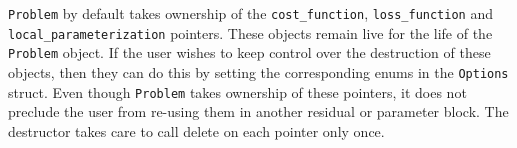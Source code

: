   \texttt{Problem} by default takes ownership of the
  \texttt{cost\_function}, \texttt{loss\_function} and \\ \texttt{local\_parameterization} pointers. These objects remain
   live for the life of the \texttt{Problem} object. If the user wishes to
  keep control over the destruction of these objects, then they can
  do this by setting the corresponding enums in the \texttt{Options} struct. Even though \texttt{Problem} takes ownership of these pointers,  it does not preclude the user from re-using them in another residual or parameter block. The destructor takes care to call
  delete on each  pointer only once.
